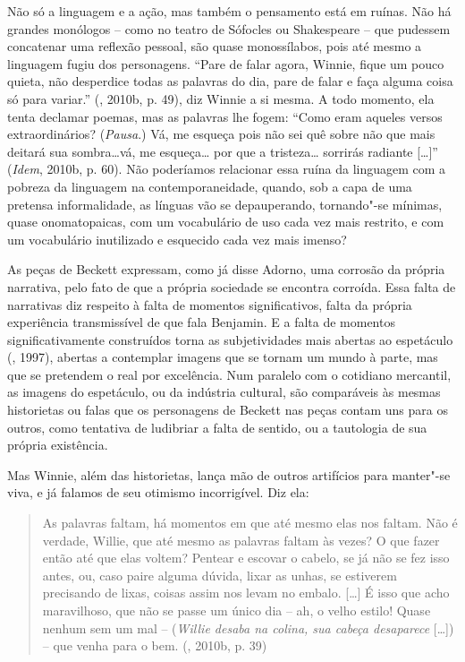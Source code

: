Não só a linguagem e a ação, mas também o pensamento está em ruínas. Não
há grandes monólogos -- como no teatro de Sófocles ou Shakespeare -- que
pudessem concatenar uma reflexão pessoal, são quase monossílabos, pois
até mesmo a linguagem fugiu dos personagens. ``Pare de falar agora,
Winnie, fique um pouco quieta, não desperdice todas as palavras do dia,
pare de falar e faça alguma coisa só para variar.'' (, 2010b, p.
49), diz Winnie a si mesma. A todo momento, ela tenta declamar poemas,
mas as palavras lhe fogem: ``Como eram aqueles versos extraordinários?
(\emph{Pausa}.) Vá, me esqueça pois não sei quê sobre não que mais
deitará sua sombra\ldots{}vá, me esqueça\ldots{} por que a tristeza\ldots{} sorrirás
radiante [\ldots{}]'' (\emph{Idem}, 2010b, p. 60). Não poderíamos
relacionar essa ruína da linguagem com a pobreza da linguagem na
contemporaneidade, quando, sob a capa de uma pretensa informalidade, as
línguas vão se depauperando, tornando"-se mínimas, quase onomatopaicas,
com um vocabulário de uso cada vez mais restrito, e com um vocabulário
inutilizado e esquecido cada vez mais imenso?

As peças de Beckett expressam, como já disse Adorno, uma corrosão da
própria narrativa, pelo fato de que a própria sociedade se encontra
corroída. Essa falta de narrativas diz respeito à falta de momentos
significativos, falta da própria experiência transmissível de que fala
Benjamin. E a falta de momentos significativamente construídos torna as
subjetividades mais abertas ao espetáculo (, 1997), abertas a
contemplar imagens que se tornam um mundo à parte, mas que se pretendem o
real por excelência. Num paralelo com o cotidiano mercantil, as imagens
do espetáculo, ou da indústria cultural, são comparáveis às mesmas
historietas ou falas que os personagens de Beckett nas peças contam uns
para os outros, como tentativa de ludibriar a falta de sentido, ou a
tautologia de sua própria existência.

Mas Winnie, além das historietas, lança mão de outros artifícios para
manter"-se viva, e já falamos de seu otimismo incorrigível. Diz ela:

\begin{quote}
As palavras faltam, há momentos em que até mesmo elas nos faltam. Não é
verdade, Willie, que até mesmo as palavras faltam às vezes? O que fazer
então até que elas voltem? Pentear e escovar o cabelo, se já não se fez
isso antes, ou, caso paire alguma dúvida, lixar as unhas, se estiverem
precisando de lixas, coisas assim nos levam no embalo. [\ldots{}] É
isso que acho maravilhoso, que não se passe um único dia -- ah, o velho
estilo! Quase nenhum sem um mal -- (\emph{Willie desaba na colina, sua
cabeça desaparece} [\ldots{}]) -- que venha para o bem. (,
2010b, p. 39)
\end{quote}

